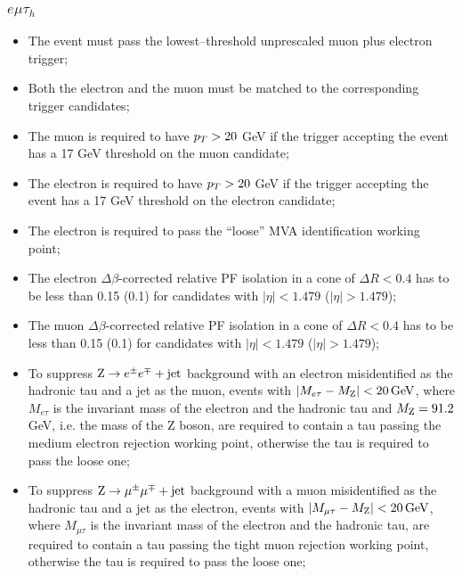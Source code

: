 \subsubsection{$e\mu\tau_h$}
\begin{itemize}
\item The event must pass the lowest--threshold unprescaled muon plus electron trigger;
\item Both the electron and the muon must be matched to the corresponding trigger candidates;
\item The muon is required to have $p_{T} > 20$ GeV if the trigger accepting the event has a 17 GeV threshold on the muon candidate;
\item The electron is required to have $p_{T} > 20$ GeV if the trigger accepting the event has a 17 GeV threshold on the electron candidate;
\item The electron is required to pass the ``loose'' MVA identification working point;
\item The electron $\Delta \beta$-corrected relative PF isolation in a cone of $\Delta R < 0.4$ has to be less than 0.15 (0.1) for candidates with $|\eta| < 1.479$ ($|\eta| > 1.479$);
\item The muon $\Delta \beta$-corrected relative PF isolation in a cone of $\Delta R < 0.4$ has to be less than 0.15 (0.1) for candidates with $|\eta| < 1.479$ ($|\eta| > 1.479$);
\item To suppress $\mathrm{Z}\rightarrow e^\pm e^\mp+\mathrm{jet}$ background with an electron misidentified as the hadronic tau and a jet as the muon, events with $|M_{e\tau} - M_{\mathrm{Z}}| < 20\, \mathrm{GeV}$, where $M_{e\tau}$ is the invariant mass of the electron and the hadronic tau and $M_{\mathrm{Z}} = 91.2$ GeV, i.e. the mass of the Z boson, are required to contain a tau passing the medium electron rejection working point, otherwise the tau is required to pass the loose one;
\item To suppress $\mathrm{Z}\rightarrow\mu^\pm \mu^\mp+\mathrm{jet}$ background with a muon misidentified as the hadronic tau and a jet as the electron, events with $|M_{\mu\tau} - M_{\mathrm{Z}}| < 20\, \mathrm{GeV}$, where $M_{\mu\tau}$ is the invariant mass of the electron and the hadronic tau, are required to contain a tau passing the tight muon rejection working point, otherwise the tau is required to pass the loose one;
\end{itemize}

